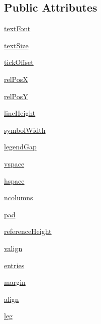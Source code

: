 \subsection*{Public Attributes}
\begin{DoxyCompactItemize}
\item 
\hyperlink{classrootplotlib_1_1Legend_a57b3d113504e87d51e7a5ddb19761d3c}{text\-Font}
\item 
\hyperlink{classrootplotlib_1_1Legend_a957b85a0c7755cd154d48ca25d870966}{text\-Size}
\item 
\hyperlink{classrootplotlib_1_1Legend_ac9989003c1f57ee8f6decc94a5343a99}{tick\-Offset}
\item 
\hyperlink{classrootplotlib_1_1Legend_ad3731c796ced73daa958bcb2595186b8}{rel\-Pos\-X}
\item 
\hyperlink{classrootplotlib_1_1Legend_ae90fe42494d84fdcd176d41724491f2b}{rel\-Pos\-Y}
\item 
\hyperlink{classrootplotlib_1_1Legend_a644d8b2db3ba2b40275386f598c63022}{line\-Height}
\item 
\hyperlink{classrootplotlib_1_1Legend_a5cd5502de2a4bce2f1bf1d479e51a194}{symbol\-Width}
\item 
\hyperlink{classrootplotlib_1_1Legend_ad4fe6598570b411ea3c5504aed9fc6f2}{legend\-Gap}
\item 
\hyperlink{classrootplotlib_1_1Legend_ac0ef0face6dd006cf217421ceaf5cc3b}{vspace}
\item 
\hyperlink{classrootplotlib_1_1Legend_adeefceed12189cd34feb5ea97523c26b}{hspace}
\item 
\hyperlink{classrootplotlib_1_1Legend_a28cc13738dc8872048ac1b2eaafda736}{ncolumns}
\item 
\hyperlink{classrootplotlib_1_1Legend_a9b84e9aca665747b662301bd595448f3}{pad}
\item 
\hyperlink{classrootplotlib_1_1Legend_ab00f75a59879455ad8e9b7cfbcf378ae}{reference\-Height}
\item 
\hyperlink{classrootplotlib_1_1Legend_a47c64e257e44bbfaaf419a3f2e0b63cf}{valign}
\item 
\hyperlink{classrootplotlib_1_1Legend_a9c57b82628c33e06ab5eb803211547fa}{entries}
\item 
\hyperlink{classrootplotlib_1_1Legend_a089fbd0b9813fee9b6c77b3cc848cbd9}{margin}
\item 
\hyperlink{classrootplotlib_1_1Legend_aef6767b97b69bc52bced7a817c2046c3}{align}
\item 
\hyperlink{classrootplotlib_1_1Legend_a455056566d743c99256493fea60cb3b4}{leg}
\end{DoxyCompactItemize}
